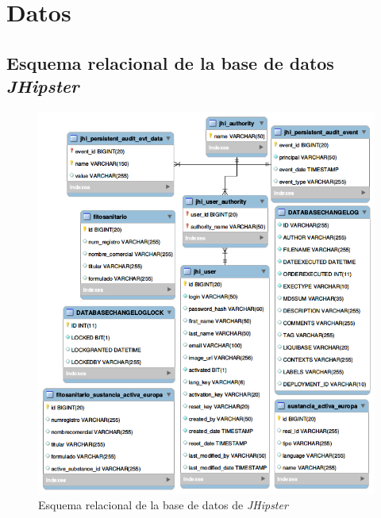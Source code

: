 \chapter{Datos} \label{a.datos}

\section{Esquema relacional de la base de datos \textit{JHipster}}


\begin{figure}[h!]
   
    \includegraphics[width=\textwidth]{Imagenes/relational}
    \caption{Esquema relacional de la base de datos de \textit{JHipster}}
    \label{fig:relacionalmysql}
\end{figure}


